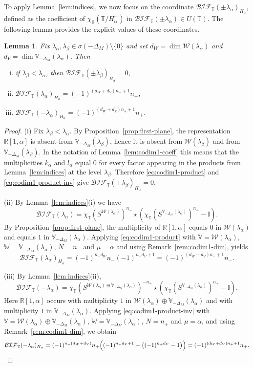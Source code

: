 \documentclass[reqno,twoside,12pt]{amsart}
\newtheorem{Lemma}[Remark]{Lemma}
\newcommand{\bI}{\mathbb{I}}
\newcommand{\bR}{\mathbb{R}}
\newcommand{\bT}{\mathbb{T}}
\newcommand{\bV}{\mathbb{V}}
\newcommand{\bW}{\mathbb{W}}
\newcommand{\cW}{\mathcal{W}}
\numberwithin{equation}{section} \errorcontextlines=0
\newcommand{\BIF}{\mathcal{BIF}}
\begin{document}
To apply Lemma~\ref{lem:indices}, we now focus on the coordinate $\BIF_\bT(\pm\lambda_\alpha)_{H_\alpha}$, defined as the coefficient of $\chi_\bT(\bT/H_\alpha^+)$ in $\BIF_\bT(\pm\lambda_\alpha)\in U(\bT)$. The following lemma provides the explicit values of these coordinates.
\begin{Lemma}\label{lem:multinUT}
Fix $\lambda_\alpha,\lambda_\beta\in\sigma(-\Delta_M)\setminus\{0\}$ and set $d_W=\dim\cW(\lambda_\alpha)$ and $d_V=\dim\bV_{-\Delta_M}(\lambda_\alpha)$. Then
\begin{enumerate}[(i)]
\item if $\lambda_\beta<\lambda_\alpha$, then $\BIF_\bT(\pm\lambda_\beta)_{H_\alpha}=0$,
\item $\BIF_\bT(\lambda_\alpha)_{H_\alpha}=(-1)^{(d_W+d_V)n_-+1}n_-$,
\item $\BIF_\bT(-\lambda_\alpha)_{H_\alpha}=(-1)^{(d_W+d_V)n_++1}n_+$.
\end{enumerate}
\end{Lemma}

\begin{proof}
(i) Fix $\lambda_\beta<\lambda_\alpha$. By Proposition~\ref{prop:first-plane}, the representation $\bR[1,\alpha]$ is absent from $\bV_{-\Delta_M}(\lambda_\beta)$, hence it is absent from $\cW(\lambda_\beta)$ and from $\bV_{-\Delta_M}(\lambda_\beta)$. In the notation of Lemma~\ref{lem:codim1-coeff} this means that the multiplicities $k_\alpha$ and $l_\alpha$ equal $0$ for every factor appearing in the products from Lemma~\ref{lem:indices} at the level $\lambda_\beta$. Therefore \eqref{eq:codim1-product} and \eqref{eq:codim1-product-inv} give $\BIF_\bT(\pm\lambda_\beta)_{H_\alpha}=0$.

(ii) By Lemma~\ref{lem:indices}(i) we have
$$\BIF_\bT(\lambda_\alpha)=\chi_\bT(S^{\cW(\lambda_\alpha)})^{n_-}\star(\chi_\bT(S^{\bV_{-\Delta_M}(\lambda_\alpha)})^{n_-}-\bI).$$
By Proposition~\ref{prop:first-plane}, the multiplicity of $\bR[1,\alpha]$ equals $0$ in $\cW(\lambda_\alpha)$ and equals $1$ in $\bV_{-\Delta_M}(\lambda_\alpha)$. Applying \eqref{eq:codim1-product} with $\bV=\cW(\lambda_\alpha)$, $\bW=\bV_{-\Delta_M}(\lambda_\alpha)$, $N=n_-$ and $\mu=\alpha$ and using Remark~\ref{rem:codim1-dim}, yields
\[
\BIF_\bT(\lambda_\alpha)_{H_\alpha}=(-1)^{n_-d_W}n_-(-1)^{n_-d_V+1}=(-1)^{(d_W+d_V)n_-+1}n_-.
\]

(iii) By Lemma~\ref{lem:indices}(ii),
$$\BIF_\bT(-\lambda_\alpha)=\chi_\bT(S^{\cW(\lambda_\alpha)\oplus\bV_{-\Delta_M}(\lambda_\alpha)})^{-n_+}\star(\chi_\bT(S^{\bV_{-\Delta_M}(\lambda_\alpha)})^{n_+}-\bI).$$
Here $\bR[1,\alpha]$ occurs with multiplicity $1$ in $\cW(\lambda_\alpha)\oplus\bV_{-\Delta_M}(\lambda_\alpha)$ and with multiplicity $1$ in $\bV_{-\Delta_M}(\lambda_\alpha)$. Applying \eqref{eq:codim1-product-inv} with $\bV=\cW(\lambda_\alpha)\oplus\bV_{-\Delta_M}(\lambda_\alpha)$, $\bW=\bV_{-\Delta_M}(\lambda_\alpha)$, $N=n_+$ and $\mu=\alpha$, and using Remark~\ref{rem:codim1-dim}, we obtain
\[
\BIF_\bT(-\lambda_\alpha)_{H_\alpha}=(-1)^{n_+(d_W+d_V)}n_+\Bigl((-1)^{n_+d_V+1}+\bigl((-1)^{n_+d_V}-1\bigr)\Bigr)=(-1)^{(d_W+d_V)n_++1}n_+.
\]
\end{proof}
\end{document}
